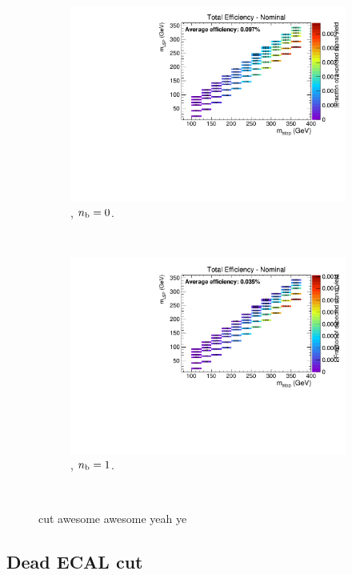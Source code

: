 \begin{figure}[h!]
\begin{subfigure}[b]{0.4\textwidth}
    \includegraphics[width=\textwidth, page=3]{Figs/sms/t2cc/v24/MHT_MET_T2cc_v24_eq0b_ge4j_incl.pdf}
    \caption{\njhigh, $n_{\text{b}} = 0$.}
  \end{subfigure}\\
  \begin{subfigure}[b]{0.4\textwidth}
    \includegraphics[width=\textwidth, page=3]{Figs/sms/t2cc/v24/MHT_MET_T2cc_v24_eq1b_ge4j_incl.pdf}
    \caption{\njhigh, $n_{\text{b}} = 1$.}
  \end{subfigure}\\
  \caption{\mhtmet cut awesome awesome yeah ye}
  \label{fig:sms-mhtmet-t2cc}
\end{figure}


\newpage
\subsection*{Dead ECAL cut}
\label{sec:t2cc_deadecal_plots}

